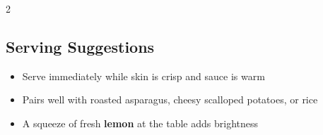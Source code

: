 \documentclass[11pt,letterpaper]{article}
\begin{document}
{\begin{multicols}{2}
\subsection*{Serving Suggestions}
\begin{itemize}
    \item Serve immediately while skin is crisp and sauce is warm
    \item Pairs well with roasted asparagus, cheesy scalloped potatoes, or rice
    \item A squeeze of fresh \textbf{lemon} at the table adds brightness
\end{itemize}

\end{multicols}
}
\end{document}
